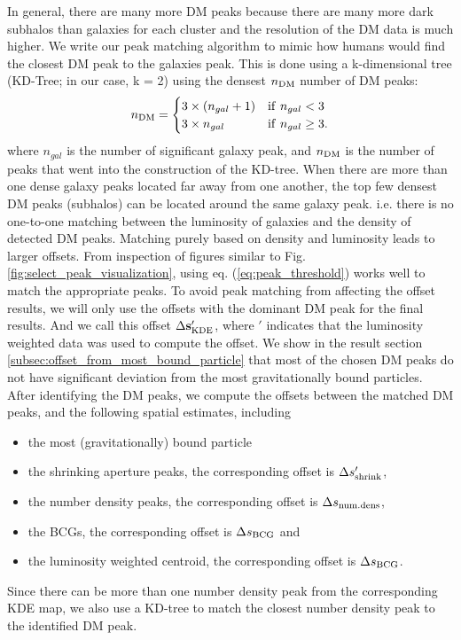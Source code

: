 In general, there are many more DM peaks because there are many more dark 
subhalos than galaxies for each cluster and the resolution of the DM data is
much higher. We write our peak matching algorithm to mimic how humans would
find the closest DM peak to the galaxies peak. 
This is done using a k-dimensional tree (KD-Tree; in our case, k = 2) 
using the densest $n_{\rm DM}$ number of DM peaks:
\begin{equation}
	n_{\rm DM} = \begin{cases}		
		3 \times (n_{gal} + 1) & {\rm if~} n_{gal} < 3 \\
	3 \times n_{gal}  & {\rm if~} n_{gal} \geq 3.
	\end{cases}
	\label{eq:peak_threshold}
\end{equation}
where $n_{gal}$ is the number of significant galaxy peak, and $n_{\rm DM}$
is the number of peaks that went into the construction of the KD-tree.
When there are more
than one dense galaxy peaks located far away from one another, 
the top few densest DM peaks (subhalos) can be located around the same galaxy peak.
i.e. there is no one-to-one matching between the luminosity of galaxies and the
density of detected DM peaks.
Matching purely based on density and luminosity leads to larger offsets.
From inspection of figures similar to Fig. \ref{fig:select_peak_visualization}, using eq. (\ref{eq:peak_threshold}) works well to match the 
appropriate peaks. 
To avoid peak matching from affecting the offset results,
we will only use the offsets with the dominant DM peak for the final results.
And we call this offset $\Delta {\bf s}_{\rm KDE}'$, where $'$ indicates that the
luminosity weighted data was used to compute the offset. 
We show in the result section \ref{subsec:offset_from_most_bound_particle} 
that most of the chosen DM peaks
do not have significant deviation from the most gravitationally bound particles.
After identifying the DM peaks, we compute the 
offsets between the matched DM peaks, and the following spatial estimates, including 
\begin{itemize}
	\item the most (gravitationally) bound particle 
	\item the shrinking aperture peaks, the corresponding offset is $\Delta s_{\rm
		shrink}'$, 
	\item the number density peaks, the corresponding offset is $\Delta s_{\rm
		num.dens}$, 
	\item the BCGs, the corresponding offset is $\Delta s_{\rm BCG}$ and
\item the luminosity weighted centroid, the corresponding offset is $\Delta s_{\rm BCG}$.
\end{itemize}
Since there can be more than one number density peak from the corresponding KDE
map, we also use a KD-tree to match the closest number density peak to the 
identified DM peak.

